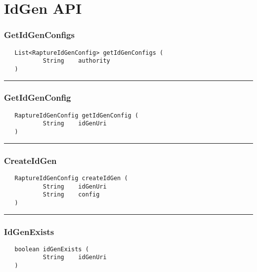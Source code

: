 \chapter{IdGen API}

\subsection{GetIdGenConfigs}
\label{Api:GetIdGenConfigs}
\begin{verbatim}
   List<RaptureIdGenConfig> getIdGenConfigs (
           String    authority
   )
\end{verbatim}



\rule{15cm}{2pt}
\subsection{GetIdGenConfig}
\label{Api:GetIdGenConfig}
\begin{verbatim}
   RaptureIdGenConfig getIdGenConfig (
           String    idGenUri
   )
\end{verbatim}



\rule{15cm}{2pt}
\subsection{CreateIdGen}
\label{Api:CreateIdGen}
\begin{verbatim}
   RaptureIdGenConfig createIdGen (
           String    idGenUri
           String    config
   )
\end{verbatim}



\rule{15cm}{2pt}
\subsection{IdGenExists}
\label{Api:IdGenExists}
\begin{verbatim}
   boolean idGenExists (
           String    idGenUri
   )
\end{verbatim}



